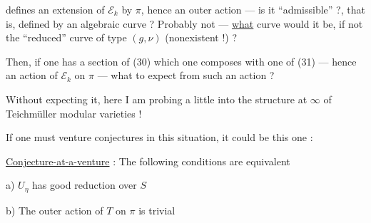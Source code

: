 defines an extension of $\mathcal E_k$ by $\pi$, hence an outer action --- is it ``admissible'' ?, that is, defined by an algebraic curve ? Probably not --- \uline{what} curve would it be, if not the ``reduced'' curve of type $(g,\nu)$ (nonexistent !) ?

Then, if one has a section of (30) which one composes with one of (31) --- hence an  action of $\mathcal E_k$ on $\pi$ --- what to expect from such an action ?

Without expecting it, here I am probing a little into the structure at $\infty$ of Teichmüller modular varieties !

If one must venture conjectures in this  situation, it could be this one :

\uline{Conjecture-at-a-venture} : The following conditions are equivalent

\noindent a) $U_\eta$ has good reduction over $S$

\noindent b) The outer action of $T$ on $\pi$ is trivial

